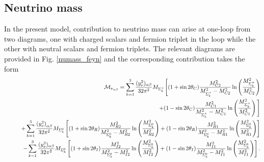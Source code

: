 \documentclass[aps, a4paper,superscriptaddress,12pt,preprintnumbers,floatfix,nofootinbib,amsmath,amssymb]{revtex4}
\newcommand{\nn}{\nonumber}
\begin{document}
\subsection{Neutrino mass}
In the present model, contribution to neutrino mass  can arise at one-loop from two diagrams, one with charged scalars  and fermion triplet in the loop while the other with neutral scalars and fermion triplets. The relevant diagrams are provided in Fig. \ref{numass_feyn} and the corresponding contribution takes the form \cite{Chen:2020ark, Lineros:2020eit, Avila:2019hhv}
\begin{eqnarray}
&&{\cal M}_{\nu_{\alpha\beta}} = \sum_{k=1}^3 \frac{({y_{\nu}^2})_{\alpha \beta}}{32 \pi^{2}}M_{\Sigma^+_k}
 \Bigg[(1+\sin2\theta_C)\frac{M_{C2}^2}{M_{\Sigma^+_k}^{2}-M_{C2}^2}\ln\left(\frac{M^2_{\Sigma^+_k}}{M^2_{C2}}\right)\nonumber\\
 &&~~~~~~~~~~~~~~~~~~~~~~~~~~~~~~~~+ (1-\sin2\theta_C)\frac{M_{C1}^2}{M_{\Sigma^+_k}^{2} -  M_{C1}^2}\ln\left(\frac{M^2_{\Sigma^+_k}}{M^2_{C1}}\right)  \Bigg]  \nonumber\\
&&~~~~~~+\sum_{k=1}^3 \frac{{(y_{\nu}^2)}_{\alpha \beta}}{32 \pi^{2}} M_{\Sigma^0_k}
 \left[(1+\sin2\theta_R)\frac{M_{R2}^2}{M_{\Sigma^0_k}^{2}-M_{R2}^2}\ln\left(\frac{M^2_{\Sigma^0_k}}{M^2_{R2}}\right) + (1-\sin2\theta_R)\frac{M_{R1}^2}{M_{\Sigma^0_k}^{2} -  M_{R1}^2}\ln\left(\frac{M^2_{\Sigma^0_k}}{M^2_{R1}}\right)  \right]  \nonumber\\
 &&~~~~~-\sum_{k=1}^3 \frac{{(y_{\nu}^2})_{\alpha \beta}}{32 \pi^{2}} M_{\Sigma^0_k}
 \left[(1+\sin2\theta_I)\frac{M_{I2}^2}{M_{\Sigma^0_k}^{2}-M_{I2}^2}\ln\left(\frac{M^2_{\Sigma^0_k}}{M^2_{I2}}\right) + (1-\sin2\theta_I)\frac{M_{I1}^2}{M_{\Sigma^0_k}^{2} -  M_{I1}^2}\ln\left(\frac{M^2_{\Sigma^0_k}}{M^2_{I1}}\right)  \right].\nn\\
\label{nu-mass}
\end{eqnarray}
%
\end{document}
